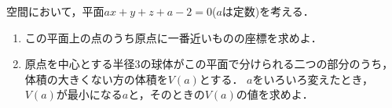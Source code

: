 \documentclass[../../main.tex]{subfiles}
\begin{document}
空間において，平面$ax+y+z+a-2=0$($a$は定数)を考える．
\begin{enumerate}
  \item この平面上の点のうち原点に一番近いものの座標を求めよ．
  \item 原点を中心とする半径3の球体がこの平面で分けられる二つの部分のうち，体積の大きくない方の体積を$V(a)$とする．
    $a$をいろいろ変えたとき，$V(a)$が最小になる$a$と，そのときの$V(a)$の値を求めよ．
\end{enumerate}
\end{document}
